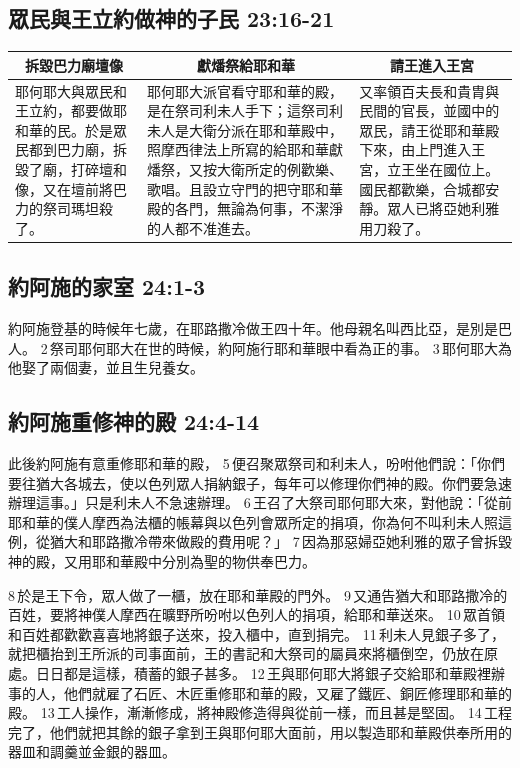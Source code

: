 \subsection{眾民與王立約做神的子民 23:16-21}
\begin{table}[H]
\centering 
\begin{tabular}{p{4.05cm}|p{7.5cm}|p{5.25cm}}\hline\hline
\multicolumn{1}{c|}{拆毀巴力廟壇像}&\multicolumn{1}{c|}{獻燔祭給耶和華}&\multicolumn{1}{c}{請王進入王宮}\\\hline\hline
耶何耶大與眾民和王立約，都要做耶和華的民。於是眾民都到巴力廟，拆毀了廟，打碎壇和像，又在壇前將巴力的祭司瑪坦殺了。 
&耶何耶大派官看守耶和華的殿，是在祭司利未人手下；這祭司利未人是大衛分派在耶和華殿中，照摩西律法上所寫的給耶和華獻燔祭，又按大衛所定的例歡樂、歌唱。且設立守門的把守耶和華殿的各門，無論為何事，不潔淨的人都不准進去。
&又率領百夫長和貴胄與民間的官長，並國中的眾民，請王從耶和華殿下來，由上門進入王宮，立王坐在國位上。國民都歡樂，合城都安靜。眾人已將亞她利雅用刀殺了。\\\hline
\end{tabular}
\end{table}


\subsection{約阿施的家室 24:1-3}
約阿施登基的時候年七歲，在耶路撒冷做王四十年。他母親名叫西比亞，是別是巴人。 2 祭司耶何耶大在世的時候，約阿施行耶和華眼中看為正的事。 3 耶何耶大為他娶了兩個妻，並且生兒養女。

\subsection{約阿施重修神的殿 24:4-14}
此後約阿施有意重修耶和華的殿， 5 便召聚眾祭司和利未人，吩咐他們說：「你們要往猶大各城去，使以色列眾人捐納銀子，每年可以修理你們神的殿。你們要急速辦理這事。」只是利未人不急速辦理。 6 王召了大祭司耶何耶大來，對他說：「從前耶和華的僕人摩西為法櫃的帳幕與以色列會眾所定的捐項，你為何不叫利未人照這例，從猶大和耶路撒冷帶來做殿的費用呢？」 7 因為那惡婦亞她利雅的眾子曾拆毀神的殿，又用耶和華殿中分別為聖的物供奉巴力。

8 於是王下令，眾人做了一櫃，放在耶和華殿的門外。 9 又通告猶大和耶路撒冷的百姓，要將神僕人摩西在曠野所吩咐以色列人的捐項，給耶和華送來。 10 眾首領和百姓都歡歡喜喜地將銀子送來，投入櫃中，直到捐完。 11 利未人見銀子多了，就把櫃抬到王所派的司事面前，王的書記和大祭司的屬員來將櫃倒空，仍放在原處。日日都是這樣，積蓄的銀子甚多。 12 王與耶何耶大將銀子交給耶和華殿裡辦事的人，他們就雇了石匠、木匠重修耶和華的殿，又雇了鐵匠、銅匠修理耶和華的殿。 13 工人操作，漸漸修成，將神殿修造得與從前一樣，而且甚是堅固。 14 工程完了，他們就把其餘的銀子拿到王與耶何耶大面前，用以製造耶和華殿供奉所用的器皿和調羹並金銀的器皿。

